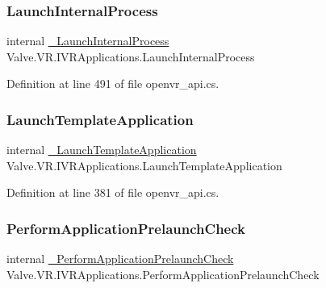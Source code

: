 \subsubsection{\texorpdfstring{LaunchInternalProcess}{LaunchInternalProcess}}
{\footnotesize\ttfamily internal \mbox{\hyperlink{struct_valve_1_1_v_r_1_1_i_v_r_applications_a298a348612023308adffef70f09fba4d}{\+\_\+\+Launch\+Internal\+Process}} Valve.\+V\+R.\+I\+V\+R\+Applications.\+Launch\+Internal\+Process}



Definition at line 491 of file openvr\+\_\+api.\+cs.

\mbox{\label{struct_valve_1_1_v_r_1_1_i_v_r_applications_add86c723c6748931bb8e74f6ee158a24}} 
\subsubsection{\texorpdfstring{LaunchTemplateApplication}{LaunchTemplateApplication}}
{\footnotesize\ttfamily internal \mbox{\hyperlink{struct_valve_1_1_v_r_1_1_i_v_r_applications_aeefde1c2d898ac0a0c855e15945f2bf3}{\+\_\+\+Launch\+Template\+Application}} Valve.\+V\+R.\+I\+V\+R\+Applications.\+Launch\+Template\+Application}



Definition at line 381 of file openvr\+\_\+api.\+cs.

\mbox{\label{struct_valve_1_1_v_r_1_1_i_v_r_applications_a6692ff62e31050e0e639aedca5dfb342}} 
\subsubsection{\texorpdfstring{PerformApplicationPrelaunchCheck}{PerformApplicationPrelaunchCheck}}
{\footnotesize\ttfamily internal \mbox{\hyperlink{struct_valve_1_1_v_r_1_1_i_v_r_applications_af8f1a196897ce93933338eca85476b37}{\+\_\+\+Perform\+Application\+Prelaunch\+Check}} Valve.\+V\+R.\+I\+V\+R\+Applications.\+Perform\+Application\+Prelaunch\+Check}



